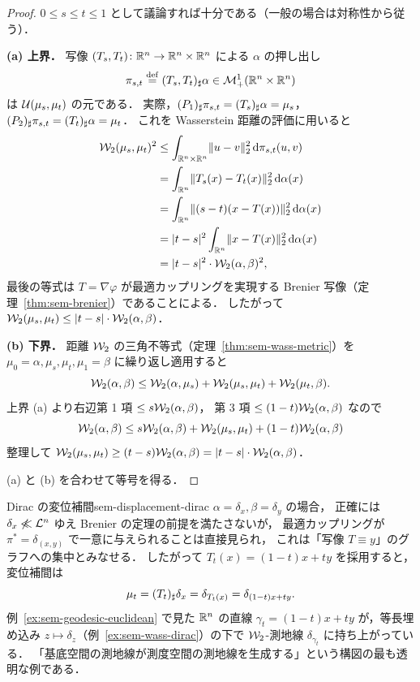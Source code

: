 \begin{proof}
  $0 \leq s \leq t \leq 1$ として議論すれば十分である（一般の場合は対称性から従う）．

  \textbf{(a) 上界．}
  写像 $(T_s, T_t) \colon \mathbb{R}^n \to \mathbb{R}^n \times \mathbb{R}^n$ による
  $\alpha$ の押し出し
  \[
    \pi_{s, t} \overset{\mathrm{def}}{=} (T_s, T_t)_\sharp \alpha
    \in \mathcal{M}_+^1(\mathbb{R}^n \times \mathbb{R}^n)
  \]
  は $\mathcal{U}(\mu_s, \mu_t)$ の元である．
  実際，$(P_1)_\sharp \pi_{s,t} = (T_s)_\sharp \alpha = \mu_s$，
  $(P_2)_\sharp \pi_{s,t} = (T_t)_\sharp \alpha = \mu_t$．
  これを Wasserstein 距離の評価に用いると
  \begin{align*}
    \mathcal{W}_2(\mu_s, \mu_t)^2
    &\leq \int_{\mathbb{R}^n \times \mathbb{R}^n} \lVert u - v \rVert_2^2 \, \mathrm{d}\pi_{s, t}(u, v) \\
    &= \int_{\mathbb{R}^n} \lVert T_s(x) - T_t(x) \rVert_2^2 \, \mathrm{d}\alpha(x) \\
    &= \int_{\mathbb{R}^n} \lVert (s - t)(x - T(x)) \rVert_2^2 \, \mathrm{d}\alpha(x) \\
    &= |t - s|^2 \int_{\mathbb{R}^n} \lVert x - T(x) \rVert_2^2 \, \mathrm{d}\alpha(x) \\
    &= |t - s|^2 \cdot \mathcal{W}_2(\alpha, \beta)^2,
  \end{align*}
  最後の等式は $T = \nabla \varphi$ が最適カップリングを実現する
  Brenier 写像（定理~\ref{thm:sem-brenier}）であることによる．
  したがって $\mathcal{W}_2(\mu_s, \mu_t) \leq |t - s| \cdot \mathcal{W}_2(\alpha, \beta)$．

  \textbf{(b) 下界．}
  距離 $\mathcal{W}_2$ の三角不等式（定理~\ref{thm:sem-wass-metric}）を
  $\mu_0 = \alpha, \mu_s, \mu_t, \mu_1 = \beta$ に繰り返し適用すると
  \[
    \mathcal{W}_2(\alpha, \beta)
    \leq \mathcal{W}_2(\alpha, \mu_s) + \mathcal{W}_2(\mu_s, \mu_t) + \mathcal{W}_2(\mu_t, \beta).
  \]
  上界 (a) より右辺第 1 項 $\leq s \mathcal{W}_2(\alpha, \beta)$，
  第 3 項 $\leq (1 - t) \mathcal{W}_2(\alpha, \beta)$ なので
  \[
    \mathcal{W}_2(\alpha, \beta)
    \leq s \mathcal{W}_2(\alpha, \beta) + \mathcal{W}_2(\mu_s, \mu_t) + (1 - t) \mathcal{W}_2(\alpha, \beta)
  \]
  整理して
  $\mathcal{W}_2(\mu_s, \mu_t) \geq (t - s) \mathcal{W}_2(\alpha, \beta)
  = |t - s| \cdot \mathcal{W}_2(\alpha, \beta)$．

  (a) と (b) を合わせて等号を得る．
\end{proof}

\begin{example}{Dirac の変位補間}{sem-displacement-dirac}
  $\alpha = \delta_x, \beta = \delta_y$ の場合，
  正確には $\delta_x \not\ll \mathcal{L}^n$ ゆえ Brenier の定理の前提を満たさないが，
  最適カップリングが $\pi^* = \delta_{(x, y)}$ で一意に与えられることは直接見られ，
  これは「写像 $T \equiv y$」のグラフへの集中とみなせる．
  したがって $T_t(x) = (1 - t) x + t y$ を採用すると，変位補間は
  \[
    \mu_t = (T_t)_\sharp \delta_x = \delta_{T_t(x)} = \delta_{(1 - t) x + t y}.
  \]
  例~\ref{ex:sem-geodesic-euclidean} で見た $\mathbb{R}^n$ の直線
  $\gamma_t = (1 - t) x + t y$ が，等長埋め込み
  $z \mapsto \delta_z$（例~\ref{ex:sem-wass-dirac}）の下で
  $\mathcal{W}_2$-測地線 $\delta_{\gamma_t}$ に持ち上がっている．
  「基底空間の測地線が測度空間の測地線を生成する」という構図の最も透明な例である．
\end{example}


